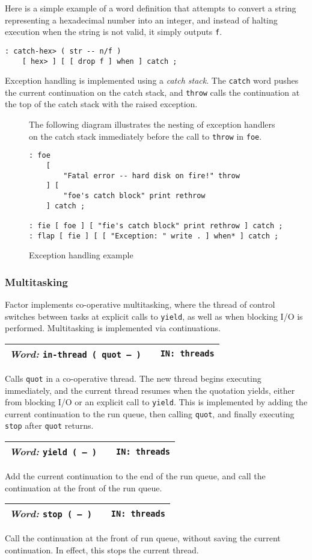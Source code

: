 \documentclass{report}
\newcommand{\ordinaryword}[3]{\index{#1}
\emph{Word:} \texttt{#2} &&\texttt{IN: #3}}
\newcommand{\wordtable}[1]{

\begin{tabularx}{12cm}[t]{lXr}
\hline
#1\\
\hline
\end{tabularx}

}
\begin{document}
Here is a simple example of a word definition that attempts to convert a string representing a hexadecimal number into an integer, and instead of halting execution when the string is not valid, it simply outputs \texttt{f}.
\begin{verbatim}
: catch-hex> ( str -- n/f )
    [ hex> ] [ [ drop f ] when ] catch ;
\end{verbatim}
Exception handling is implemented using a \emph{catch stack}. The \texttt{catch} word pushes the current continuation on the catch stack, and \texttt{throw} calls the continuation at the top of the catch stack with the raised exception.

\begin{figure}
\caption{Exception handling example}
The following diagram illustrates the nesting of exception handlers on the catch stack immediately before the call to \texttt{throw} in \texttt{foe}.
\begin{verbatim}
: foe
    [
        "Fatal error -- hard disk on fire!" throw
    ] [
        "foe's catch block" print rethrow
    ] catch ;

: fie [ foe ] [ "fie's catch block" print rethrow ] catch ;
: flap [ fie ] [ [ "Exception: " write . ] when* ] catch ;
\end{verbatim}

\begin{center}
\end{center}
\end{figure}

\subsubsection{\label{threads}Multitasking}

Factor implements co-operative multitasking, where the thread of control switches between tasks at explicit calls to \texttt{yield}, as well as when blocking I/O is performed. Multitasking is implemented via continuations.
\wordtable{
\ordinaryword{in-thread}{in-thread ( quot -- )}{threads}
}
Calls \texttt{quot} in a co-operative thread. The new thread begins executing immediately, and the current thread resumes when the quotation yields, either from blocking
I/O or an explicit call to \texttt{yield}. This is implemented by adding the current continuation to the run queue, then calling \texttt{quot}, and finally executing \texttt{stop} after \texttt{quot} returns.
\wordtable{
\ordinaryword{yield}{yield ( -- )}{threads}
}
Add the current continuation to the end of the run queue, and call the continuation at the front of the run queue.
\wordtable{
\ordinaryword{stop}{stop ( -- )}{threads}
}
Call the continuation at the front of run queue, without saving the current continuation. In effect, this stops the current thread.
\end{document}
